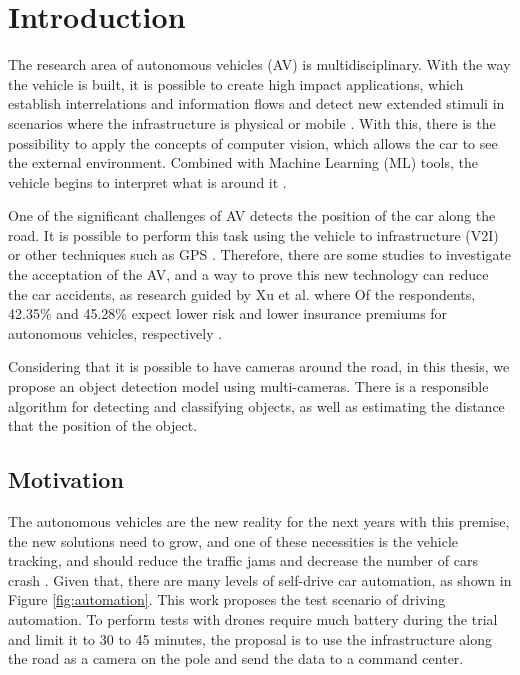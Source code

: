 \chapter{Introduction} \label{introducao}
The research area of autonomous vehicles (AV) is multidisciplinary. With the way the vehicle is built, it is possible to create high impact applications, which establish interrelations and information flows and detect new extended stimuli in scenarios where the infrastructure is physical or mobile \cite{bayat2017environmental}. With this, there is the possibility to apply the concepts of computer vision, which allows the car to see the external environment. Combined with Machine Learning (ML) tools, the vehicle begins to interpret what is around it \cite{rasouli2019autonomous}.

One of the significant challenges of AV detects the position of the car along the road. It is possible to perform this task using the vehicle to infrastructure (V2I) or other techniques such as GPS \cite{hobert2015enhancements}. Therefore, there are some studies to investigate the acceptation of the AV, and a way to prove this new technology can reduce the car accidents, as research guided by Xu et al. where Of the respondents, 42.35\% and 45.28\% expect lower risk and lower insurance premiums for autonomous vehicles, respectively \cite{xu2019autonomous}.

Considering that it is possible to have cameras around the road, in this thesis, we propose an object detection model using multi-cameras. There is a responsible algorithm for detecting and classifying objects, as well as estimating the distance that the position of the object.

\section{Motivation}

The autonomous vehicles are the new reality for the next years with this premise, the new solutions need to grow, and one of these necessities is the vehicle tracking, and should reduce the traffic jams and decrease the number of cars crash \cite{bonnefon2016social}. Given that, there are many levels of self-drive car automation, as shown in Figure \ref{fig:automation}. This work proposes the test scenario of driving automation. To perform tests with drones require much battery during the trial and limit it to 30 to 45 minutes, the proposal is to use the infrastructure along the road as a camera on the pole and send the data to a command center.

